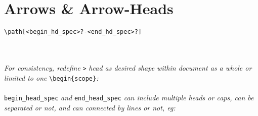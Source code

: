 \section{Arrows \& Arrow-Heads}

\begin{lstlisting}
\path[<begin_hd_spec>?-<end_hd_spec>?]
\end{lstlisting}
 \\
 \\

\textit{For consistency, redefine }\texttt{>}\textit{ head as desired shape within document as a whole or limited to one }\texttt{\textbackslash begin\{scope\}}\textit{:}\\
 \\

\texttt{begin\_head\_spec}\textit{ and }\texttt{end\_head\_spec}\textit{ can include multiple heads or caps, can be separated or not, and can connected by lines or not, eg:}\\
\\
\\
\\
\\



